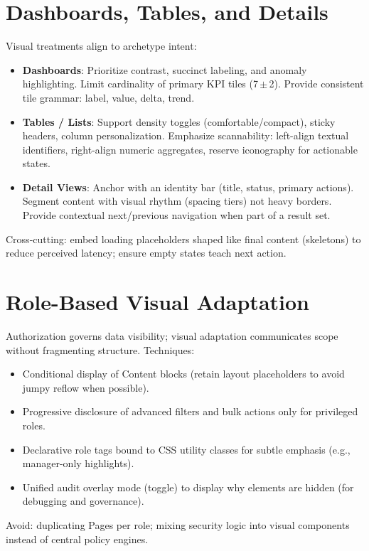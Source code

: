 \section{Dashboards, Tables, and Details}
Visual treatments align to archetype intent:
\begin{itemize}
	\item \textbf{Dashboards}: Prioritize contrast, succinct labeling, and anomaly highlighting. Limit cardinality of primary KPI tiles (7\,$\pm$\,2). Provide consistent tile grammar: label, value, delta, trend.
	\item \textbf{Tables / Lists}: Support density toggles (comfortable/compact), sticky headers, column personalization. Emphasize scannability: left-align textual identifiers, right-align numeric aggregates, reserve iconography for actionable states.
	\item \textbf{Detail Views}: Anchor with an identity bar (title, status, primary actions). Segment content with visual rhythm (spacing tiers) not heavy borders. Provide contextual next/previous navigation when part of a result set.
\end{itemize}
Cross-cutting: embed loading placeholders shaped like final content (skeletons) to reduce perceived latency; ensure empty states teach next action.

\section{Role-Based Visual Adaptation}
Authorization governs data visibility; visual adaptation communicates scope without fragmenting structure. Techniques:
\begin{itemize}
	\item Conditional display of Content blocks (retain layout placeholders to avoid jumpy reflow when possible).
	\item Progressive disclosure of advanced filters and bulk actions only for privileged roles.
	\item Declarative role tags bound to CSS utility classes for subtle emphasis (e.g., manager-only highlights).
	\item Unified audit overlay mode (toggle) to display why elements are hidden (for debugging and governance).
\end{itemize}
Avoid: duplicating Pages per role; mixing security logic into visual components instead of central policy engines.

